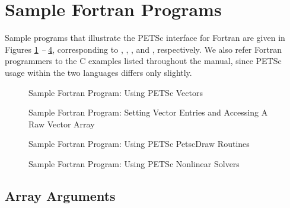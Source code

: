 \section{Sample Fortran Programs}
\label{sec_fortran-examples}

Sample programs that illustrate the PETSc interface for Fortran
are given in Figures \ref{fig_vec-Fortran} {\em --} \ref{fig_SNES-Fortran},
corresponding to
\href{http://www.mcs.anl.gov/petsc/petsc-current/src/vec/vec/examples/tests/ex19f.F.html}{},
\href{http://www.mcs.anl.gov/petsc/petsc-current/src/vec/vec/examples/tutorials/ex4f.F.html}{},
\break 
\href{http://www.mcs.anl.gov/petsc/petsc-current/src/sys/classes/draw/examples/tests/ex5f.F.html}{}, and
\href{http://www.mcs.anl.gov/petsc/petsc-current/src/snes/examples/tutorials/ex1f.F.html}{}, respectively.  We also
refer Fortran programmers to the C examples listed throughout the manual,
since PETSc usage within the two languages differs only slightly.

\begin{figure}[H]
  
\caption{Sample Fortran Program:  Using PETSc Vectors}
\label{fig_vec-Fortran}
\end{figure}

\begin{figure}[H]
  
\caption{Sample Fortran Program: Setting Vector Entries and Accessing A Raw Vector Array} 
\label{fig_vec2-Fortran}
\end{figure}

\begin{figure}[H]
  
\caption{Sample Fortran Program:  Using PETSc PetscDraw Routines}
\label{fig_draw-Fortran}
\end{figure}

\begin{figure}[H]
  
\caption{Sample Fortran Program:  Using PETSc Nonlinear Solvers}
\label{fig_SNES-Fortran}
\end{figure}

\subsection{Array Arguments}
\label{sec_fortranarrays}

